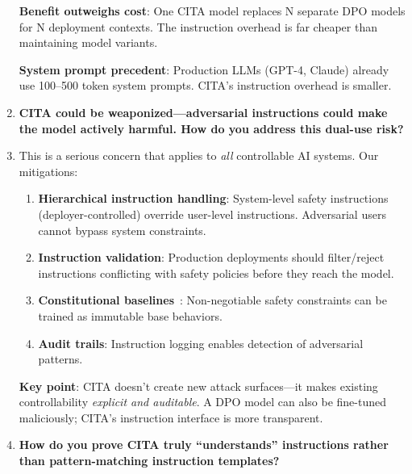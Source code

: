 \begin{enumerate}[label=\textbf{Q\arabic*.}, leftmargin=*, itemsep=8pt]
\textbf{Benefit outweighs cost}: One CITA model replaces N separate DPO models for N deployment contexts. The instruction overhead is far cheaper than maintaining model variants.

\textbf{System prompt precedent}: Production LLMs (GPT-4, Claude) already use 100--500 token system prompts. CITA's instruction overhead is smaller.

\vspace{4mm}

\item[\ding{93}] \textbf{CITA could be weaponized---adversarial instructions could make the model actively harmful. How do you address this dual-use risk?}

\item[\ding{224}] This is a serious concern that applies to \textit{all} controllable AI systems. Our mitigations:

\begin{enumerate}[leftmargin=*,itemsep=2pt]
    \item \textbf{Hierarchical instruction handling}: System-level safety instructions (deployer-controlled) override user-level instructions. Adversarial users cannot bypass system constraints.

    \item \textbf{Instruction validation}: Production deployments should filter/reject instructions conflicting with safety policies before they reach the model.

    \item \textbf{Constitutional baselines}~\cite{bai2022constitutional}: Non-negotiable safety constraints can be trained as immutable base behaviors.

    \item \textbf{Audit trails}: Instruction logging enables detection of adversarial patterns.
\end{enumerate}

\textbf{Key point}: CITA doesn't create new attack surfaces---it makes existing controllability \textit{explicit and auditable}. A DPO model can also be fine-tuned maliciously; CITA's instruction interface is more transparent.

\vspace{4mm}

\item[\ding{93}] \textbf{How do you prove CITA truly ``understands'' instructions rather than pattern-matching instruction templates?}


\end{enumerate}
